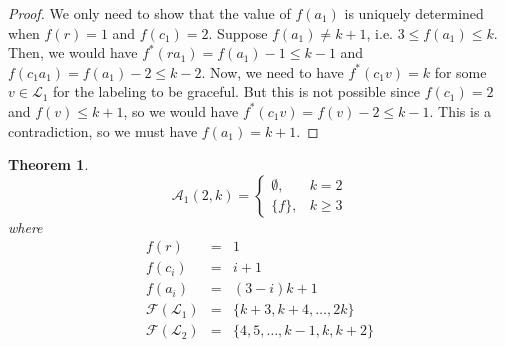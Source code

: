\documentclass[10pt]{article}
\newtheorem{theorem}{Theorem}
\theoremstyle{definition}
\begin{document}
\begin{proof}
  We only need to show that the value of $f(a_1)$ is uniquely determined when $f(r) = 1$ and $f(c_1) = 2$. Suppose $f(a_1) \neq k + 1$, i.e. $3 \le f(a_1) \le k$. Then, we would have $f^*(r a_1) = f(a_1) - 1 \le k - 1$ and $f(c_1 a_1) = f(a_1) - 2 \le k - 2$. Now, we need to have $f^*(c_1 v) = k$ for some $v \in \mathcal{L}_1$ for the labeling to be graceful. But this is not possible since $f(c_1) = 2$ and $f(v) \le k + 1$, so we would have $f^*(c_1 v) = f(v) - 2 \le k - 1$. This is a contradiction, so we must have $f(a_1) = k + 1$.
\end{proof}

\begin{theorem}
  \label{thm:A_1(2,k)}
  $$
  \mathcal{A}_1(2, k) =
  \begin{cases}
    \emptyset,& k = 2\\
    \{f\},& k \ge 3
  \end{cases}
  $$
  where
  $$
  \begin{array}{lcl}
    f(r) & = & 1 \\
    f(c_i) & = & i + 1 \\
    f(a_i) & = & (3 - i)k + 1 \\
    \mathcal{F}(\mathcal{L}_1) & = & \{k + 3, k + 4, \dots, 2k\}\\
    \mathcal{F}(\mathcal{L}_2) & = & \{4, 5, \dots, k-1, k, k+2\}\\
  \end{array}
  $$
\end{theorem}
\end{document}
